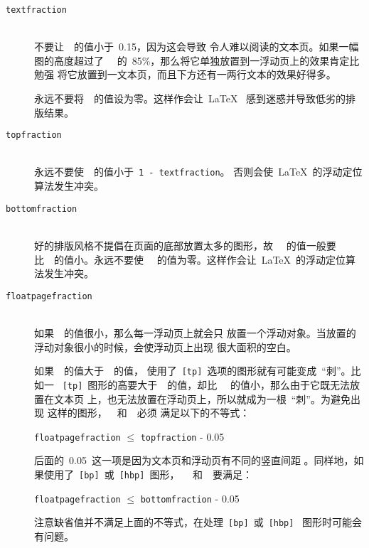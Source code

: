 \begin{description}
	\item [\texttt{\bs textfraction}] \mbox{} \\
	不要让~~的值小于~0.15，因为这会导致
	令人难以阅读的文本页。如果一幅图的高度超过了~~
	的~85\%，那么将它单独放置到一浮动页上的效果肯定比勉强
	将它放置到一文本页，而且下方还有一两行文本的效果好得多。
	
	永远不要将~~的值设为零。这样作会让~\LaTeX{}~
	感到迷惑并导致低劣的排版结果。
	\item [\texttt{\bs topfraction}] \mbox{} \\
	永远不要使~~的值小于~\texttt{1 - \bs textfraction}。
	否则会使~\LaTeX{}~的浮动定位算法发生冲突。
	\item [\texttt{\bs bottomfraction}] \mbox{} \\
	好的排版风格不提倡在页面的底部放置太多的图形，故~~
	的值一般要比~~的值小。永远不要使~~
	的值为零。这样作会让~\LaTeX{}~的浮动定位算法发生冲突。
	\item [\texttt{\bs floatpagefraction}] \mbox{} \\
	如果~~的值很小，那么每一浮动页上就会只
	放置一个浮动对象。当放置的浮动对象很小的时候，会使浮动页上出现
	很大面积的空白。
	
	如果~~的值大于~~的值，
	使用了~\texttt{[tp]}~选项的图形就有可能变成~``刺''。比如一
	~\texttt{[tp]}~图形的高要大于~~的值，却比
	~~的值小，那么由于它既无法放置在文本页
	上，也无法放置在浮动页上，所以就成为一根~``刺''。为避免出现
	这样的图形，~~和~~必须
	满足以下的不等式：
	
	\texttt{\bs floatpagefraction} $\leq$ \texttt{\bs topfraction} - 0.05
	
	后面的~0.05~这一项是因为文本页和浮动页有不同的竖直间距
	。同样地，如果使用了~\texttt{[bp]}~或~\texttt{[hbp]}~图形，
	~~和~~要满足：
	
	\texttt{\bs floatpagefraction} $\leq$ \texttt{\bs bottomfraction} - 0.05
	
	注意缺省值并不满足上面的不等式，在处理~\texttt{[bp]}~或~\texttt{[hbp]}~
	图形时可能会有问题。
\end{description}

